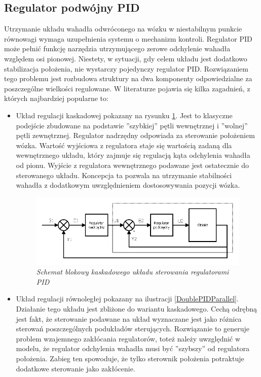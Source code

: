\documentclass[12pt, twoside, openany]{report}
\theoremstyle{definition}
\begin{document}
\subsection{Regulator podwójny PID}
\label{DoublePID}
Utrzymanie układu wahadła odwróconego na wózku w niestabilnym punkcie równowagi wymaga uzupełnienia systemu o mechanizm kontroli. Regulator PID może pełnić funkcję narzędzia utrzymującego zerowe odchylenie wahadła względem osi pionowej. Niestety, w sytuacji, gdy celem układu jest dodatkowo stabilizacja położenia, nie wystarczy pojedynczy regulator PID. Rozwiązaniem tego problemu jest rozbudowa struktury na dwa komponenty odpowiedzialne za poszczególne wielkości regulowane. W literaturze pojawia się kilka zagadnień, z których najbardziej popularne to:
\begin{itemize}
\item Układ regulacji kaskadowej pokazany na rysunku \ref{DoublePIDCascade}. Jest to klasyczne podejście zbudowane na podstawie ''szybkiej'' pętli wewnętrznej i ''wolnej'' pętli zewnętrznej. Regulator nadrzędny odpowiada za sterowanie położeniem wózka. Wartość wyjściowa z regulatora staje się wartością zadaną dla wewnętrznego układu, który zajmuje się regulacją kąta odchylenia wahadła od pionu. Wyjście z regulatora wewnętrznego podawane jest ostatecznie do sterowanego układu. Koncepcja ta pozwala na utrzymanie stabilności wahadła z dodatkowym uwzględnieniem dostosowywania pozycji wózka.

\begin{figure}[H]
	\centering
		\includegraphics[width = 350pt]{DoublePIDCascade} 
		\caption{\textit{Schemat blokowy kaskadowego układu sterowania regulatorami PID\cite{JTJT}}}
		\label{DoublePIDCascade}
\end{figure}

\item Układ regulacji równoległej pokazany na ilustracji \ref{DoublePIDParallel}. Działanie tego układu jest zbliżone do wariantu kaskadowego. Cechą odrębną jest fakt, że sterowanie podawane na układ wyznaczane jest jako różnica sterowań poszczególnych podukładów sterujących. Rozwiązanie to generuje problem wzajemnego zakłócania regulatorów, toteż należy uwzględnić w modelu, że regulator odchylenia wahadła musi być ''szybszy'' od regulatora położenia. Zabieg ten spowoduje, że tylko sterownik położenia potraktuje dodatkowe sterowanie jako zakłócenie.


\end{itemize}
\end{document}

